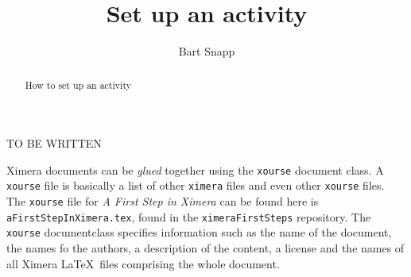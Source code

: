 \documentclass{ximera}
\title{Set up an activity}
\author{Bart Snapp}
\begin{document}
\begin{abstract}
  How to set up an activity
\end{abstract}
\maketitle


{\color{red} TO BE WRITTEN 
}

Ximera documents can be \textit{glued} together using the \texttt{xourse}
document
class.
A \verb|xourse| file is basically a list of other \verb|ximera| files and even
other \verb|xourse| files.
The \verb|xourse| file for \textit{A First Step in Ximera} can be found here is
\verb!aFirstStepInXimera.tex!, found in the \verb!ximeraFirstSteps! repository.
The \verb!xourse! documentclass specifies information such as the name of the
document, the names fo the authors, a description of the content, a license and
the names of all Ximera \LaTeX\ files comprising
the whole document.
\end{document}
